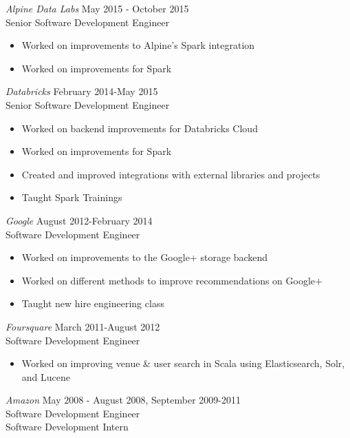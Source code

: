 \documentclass[10pt,line,margin=0.1]{newsres}
\begin{document}
\begin{resume}
        {\sl Alpine Data Labs} \hfill May 2015 - October 2015\\
        Senior Software Development Engineer
        \begin{itemize}  \itemsep -2pt %
          \item Worked on improvements to Alpine's Spark integration
          \item Worked on improvements for Spark
        \end{itemize}
      {\sl Databricks} \hfill February 2014-May 2015\\
        Senior Software Development Engineer
        \begin{itemize}  \itemsep -2pt %
          \item Worked on backend improvements for Databricks Cloud
          \item Worked on improvements for Spark
          \item Created and improved integrations with external libraries and projects
          \item Taught Spark Trainings
        \end{itemize}
        {\sl Google} \hfill August 2012-February 2014\\
        Software Development Engineer
        \begin{itemize}  \itemsep -2pt %
          \item Worked on improvements to the Google+ storage backend
          \item Worked on different methods to improve recommendations on Google+
          \item Taught new hire engineering class
        \end{itemize}
        {\sl Foursquare} \hfill March 2011-August 2012\\
        Software Development Engineer
        \begin{itemize}  \itemsep -2pt %
        \item Worked on improving venue \& user search in Scala using Elasticsearch, Solr, and Lucene
        \end{itemize}
        {\sl Amazon} \hfill            May 2008 - August 2008, September 2009-2011 \\
        Software Development Engineer \\
        Software Development Intern
        \begin{itemize}  \itemsep -2pt %

\end{itemize}
\end{resume}
\end{document}
